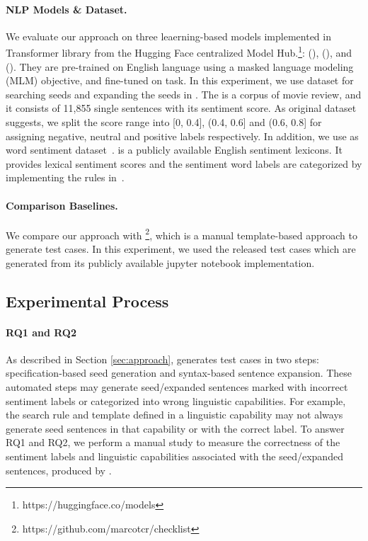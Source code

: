 \paragraph{\textbf{NLP Models \& Dataset.}}
We evaluate our approach on three leaerning-based \sa models
implemented in Transformer library from the Hugging Face centralized
Model Hub.\footnote{https://huggingface.co/models}: \texttt{\Bert}
(\bertsamodel), \texttt{\Roberta} (\robertasamodel), and
\texttt{\Dbert} (\disbertsamodel). They are pre-trained on English
language using a masked language modeling (MLM) objective, and
fine-tuned on \sa task. In this experiment, we use \Sstt dataset for
searching seeds and expanding the seeds in \tool. The \Sstt is a
corpus of movie review, and it consists of 11,855 single sentences
with its sentiment score. As original dataset suggests, we split the
score range into [0, 0.4], (0.4, 0.6] and (0.6, 0.8] for assigning
    negative, neutral and positive labels respectively. In addition,
    we use \Swn as word sentiment
    dataset~\cite{baccianella2010sentiwordnet}. \Swn is a publicly
    available English sentiment lexicons.  It provides lexical
    sentiment scores and the sentiment word labels are categorized by
    implementing the rules in~\cite{mihaela2017sentiwordnetlabel}.

\paragraph{\textbf{Comparison Baselines.}}
We compare our approach with
\Cklst\footnote{https://github.com/marcotcr/checklist}, which is a
manual template-based approach to generate test cases. In this
experiment, we used the \Cklst released \sa test cases which are
generated from its publicly available jupyter notebook implementation.


\subsection{Experimental Process}

\paragraph{\textbf{RQ1 and RQ2}} As described in Section \ref{sec:approach},
\tool generates test cases in two steps: specification-based seed
generation and syntax-based sentence expansion. These automated steps
may generate seed/expanded sentences marked with incorrect sentiment
labels or categorized into wrong linguistic capabilities. For example,
the search rule and template defined in a linguistic capability may
not always generate seed sentences in that capability or with the
correct label.  To answer RQ1 and RQ2, we perform a manual study to
measure the correctness of the sentiment labels and linguistic
capabilities associated with the seed/expanded sentences, produced by
\tool.

